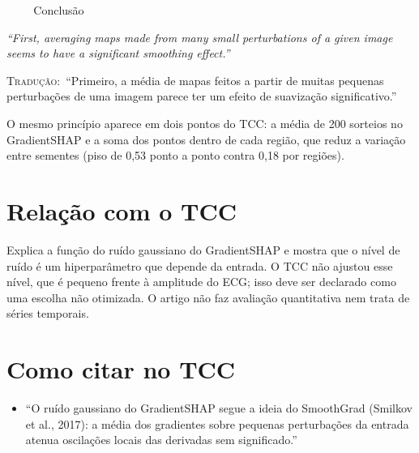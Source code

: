 \documentclass[11pt,a4paper]{article}
\newcommand{\pagechip}[1]{{\setlength{\fboxsep}{1.5pt}\colorbox{cAcc}{\textcolor{white}{\scriptsize\texttt{#1}}}}}
\newenvironment{origquote}{\par\itshape\small}{\par}
\newenvironment{tradquote}{\par\small\textsc{Tradução:}\ }{\par}
\newcommand{\explab}[1]{\par\smallskip{\small\color{cAcc}\textbf{\MakeUppercase{#1}}}\par}
\begin{document}
\begin{citacard}{\pagechip{p. 5} Conclusão}
\begin{origquote}“First, averaging maps made from many small perturbations of a given image seems to have a significant smoothing effect.”\end{origquote}
\begin{tradquote}“Primeiro, a média de mapas feitos a partir de muitas pequenas perturbações de uma imagem parece ter um efeito de suavização significativo.”\end{tradquote}
\explab{Explicação}
O mesmo princípio aparece em dois pontos do TCC: a média de 200 sorteios no GradientSHAP e a soma dos pontos dentro de cada região, que reduz a variação entre sementes (piso de 0,53 ponto a ponto contra 0,18 por regiões).
\end{citacard}

\section{Relação com o TCC}
Explica a função do ruído gaussiano do GradientSHAP e mostra que o nível de ruído é um hiperparâmetro que depende da entrada. O TCC não ajustou esse nível, que é pequeno frente à amplitude do ECG; isso deve ser declarado como uma escolha não otimizada. O artigo não faz avaliação quantitativa nem trata de séries temporais.

\section{Como citar no TCC}
\begin{itemize}
\item ``O ruído gaussiano do GradientSHAP segue a ideia do SmoothGrad (Smilkov et al., 2017): a média dos gradientes sobre pequenas perturbações da entrada atenua oscilações locais das derivadas sem significado.''
\end{itemize}
\end{document}
